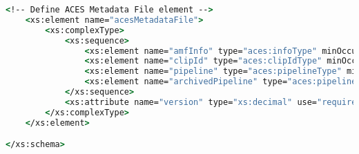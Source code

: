 \begin{lstlisting}[language=csh]
	<!-- Define ACES Metadata File element -->
	<xs:element name="acesMetadataFile">
		<xs:complexType>
			<xs:sequence>
				<xs:element name="amfInfo" type="aces:infoType" minOccurs="1" maxOccurs="1"/>
				<xs:element name="clipId" type="aces:clipIdType" minOccurs="0" maxOccurs="1"/>
				<xs:element name="pipeline" type="aces:pipelineType" minOccurs="1" maxOccurs="1"/>
				<xs:element name="archivedPipeline" type="aces:pipelineType" minOccurs="0" maxOccurs="unbounded"/>
			</xs:sequence>
			<xs:attribute name="version" type="xs:decimal" use="required" fixed="1.0"/>
		</xs:complexType>
	</xs:element>

</xs:schema>
\end{lstlisting}
